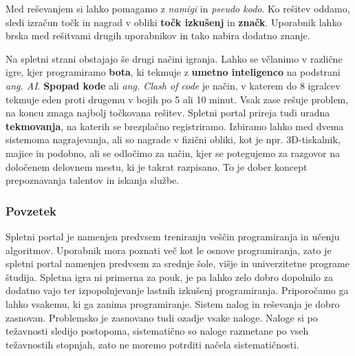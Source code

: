  Med reševanjem si lahko pomagamo z \emph{namigi} in \emph{pseudo
   kodo}. Ko rešitev oddamo, sledi izračun točk in nagrad v obliki
 \textbf{točk izkušenj} in \textbf{značk}. Uporabnik lahko brska
 med rešitvami drugih uporabnikov in tako nabira dodatno znanje.

 Na spletni strani obstajajo še drugi načini igranja. Lahko se
 včlanimo v različne igre, kjer programiramo \textbf{bota}, ki
 tekmuje z \textbf{umetno inteligenco} na podstrani
 \emph{ang. AI}. \textbf{Spopad kode} ali \emph{ang. Clash of code} je
 način, v katerem do 8 igralcev tekmuje eden proti drugemu v bojih po
 5 ali 10 minut. Vsak zase rešuje problem, na koncu zmaga najbolj
 točkovana rešitev. Spletni portal prireja tudi uradna
 \textbf{tekmovanja}, na katerih se brezplačno registriramo. Izbiramo
 lahko med dvema sistemoma nagrajevanja, ali so nagrade v fizični
 obliki, kot je npr. 3D-tiskalnik, majice in podobno, ali se odločimo
 za način, kjer se potegujemo za razgovor na določenem delovnem mestu,
 ki je takrat razpisano. To je dober koncept prepoznavanja talentov in
 iskanja službe.
 
\subsubsection{Povzetek}
\label{sec:povzetek_codingame}

Spletni portal je namenjen predvsem treniranju veščin programiranja
in učenju algoritmov. Uporabnik mora poznati več kot le osnove
programiranja, zato je spletni portal namenjen predvsem za srednje
šole, višje in univerzitetne programe študija. Spletna igra ni
primerna za pouk, je pa lahko zelo dobro dopolnilo za dodatno vajo ter
izpopolnjevanje lastnih izkušenj programiranja. Priporočamo ga lahko
vsakemu, ki ga zanima programiranje. Sistem nalog in reševanja je
dobro zasnovan. Problemsko je zasnovano tudi ozadje vsake
naloge. Naloge si po težavnosti sledijo postopoma, sistematično so
naloge razmetane po vseh težavnostih stopnjah, zato ne moremo potrditi
načela sistematičnosti. 


